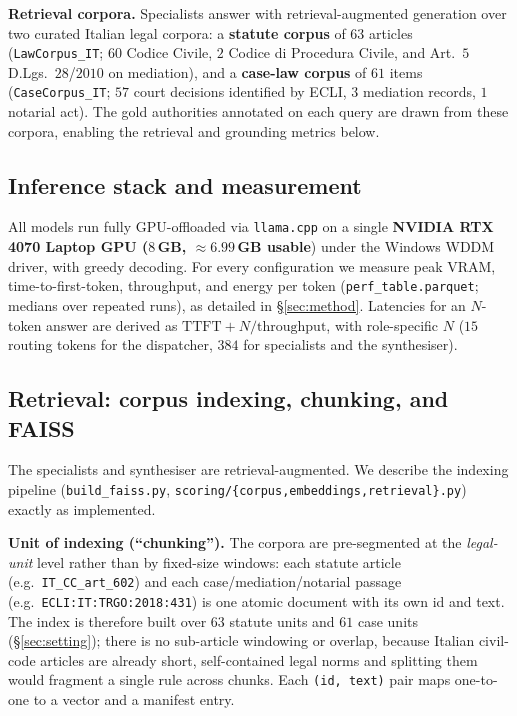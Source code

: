 \documentclass[11pt]{article}
\begin{document}
\textbf{Retrieval corpora.} Specialists answer with retrieval-augmented generation
over two curated Italian legal corpora: a \textbf{statute corpus} of $63$ articles
(\texttt{LawCorpus\_IT}; $60$ Codice Civile, $2$ Codice di Procedura Civile, and
Art.~$5$ D.Lgs.~$28$/$2010$ on mediation), and a \textbf{case-law corpus} of $61$
items (\texttt{CaseCorpus\_IT}; $57$ court decisions identified by ECLI, $3$
mediation records, $1$ notarial act). The gold authorities annotated on each query
are drawn from these corpora, enabling the retrieval and grounding metrics below.

\subsection{Inference stack and measurement}
All models run fully GPU-offloaded via \texttt{llama.cpp} on a single
\textbf{NVIDIA RTX 4070 Laptop GPU ($8$\,GB, $\approx$$6.99$\,GB usable}) under the
Windows WDDM driver, with greedy decoding. For every configuration we measure peak
VRAM, time-to-first-token, throughput, and energy per token
(\texttt{perf\_table.parquet}; medians over repeated runs), as detailed in
§\ref{sec:method}. Latencies for an $N$-token answer are derived as
$\mathrm{TTFT}+N/\mathrm{throughput}$, with role-specific $N$ ($15$ routing tokens
for the dispatcher, $384$ for specialists and the synthesiser).

\subsection{Retrieval: corpus indexing, chunking, and FAISS}
\label{sec:setting-retrieval}
The specialists and synthesiser are retrieval-augmented. We describe the indexing
pipeline (\texttt{build\_faiss.py}, \texttt{scoring/\{corpus,embeddings,retrieval\}.py})
exactly as implemented.

\textbf{Unit of indexing (``chunking'').} The corpora are pre-segmented at the
\emph{legal-unit} level rather than by fixed-size windows: each statute article
(e.g.\ \texttt{IT\_CC\_art\_602}) and each case/mediation/notarial passage (e.g.\
\texttt{ECLI:IT:TRGO:2018:431}) is one atomic document with its own id and text.
The index is therefore built over $63$ statute units and $61$ case units
(§\ref{sec:setting}); there is no sub-article windowing or overlap, because Italian
civil-code articles are already short, self-contained legal norms and splitting
them would fragment a single rule across chunks. Each \texttt{(id, text)} pair maps
one-to-one to a vector and a manifest entry.
\end{document}
